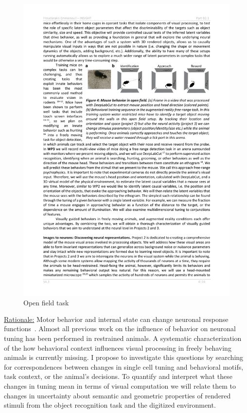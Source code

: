 \documentclass[COG,11pt]{ercgrant}
\begin{document}
\begin{figure}
\includegraphics[width=\linewidth,trim=0 15 0 5, clip]{figures/openfield_ar.pdf}
\caption{Open field task}
\label{fig:openfield}
\end{figure}

\underline{Rationale:} 
Motor behavior and internal state can change neuronal response functions~\parencite{Chiappe2010-bm, Bezdudnaya2006-ge, Andermann2011-vw, Treue1996-lp,Franke2022-do}. 
Almost all previous work on the influence of behavior on neuronal tuning has been performed in restrained animals. 
A systematic characterization of the how behavioral context influences visual processing in freely behaving animals is currently missing. 
I propose to investigate this questions by searching for correspondences between changes in single cell tuning and behavioral motifs, task context, or the animal's decisions.
To quantify and interpret what these changes in tuning mean in terms of visual computation we will relate them to changes in uncertainty about semantic and geometric properties of rendered stimuli from the object recognition task and the digitized environment.
\end{document}
